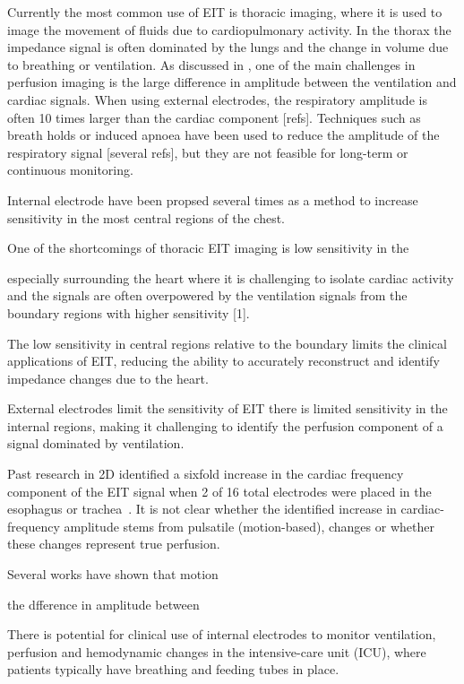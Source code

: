 Currently the most common use of EIT is
thoracic imaging, where it is used to image the movement
of fluids due to cardiopulmonary activity.
In the thorax the impedance signal is often dominated by 
the lungs and the change in volume due to breathing 
or ventilation. 
As discussed in , one of the main challenges 
in perfusion imaging is the large difference in amplitude 
between the ventilation and cardiac signals. 
When using external electrodes, the respiratory amplitude is 
often 10 times larger than the cardiac component [refs]. Techniques such as 
breath holds or induced apnoea have been used to  reduce the
amplitude of the respiratory signal [several refs], but they are not feasible for 
long-term or continuous monitoring. 


Internal electrode have been propsed several times as a method to increase 
sensitivity in the 
most central regions of the chest. 


One of the shortcomings of thoracic EIT imaging is low sensitivity in the


especially surrounding the
heart where it is challenging to isolate cardiac activity and
the signals are often overpowered by the ventilation signals
from the boundary regions with higher sensitivity [1].

The
low sensitivity in central regions relative to the boundary
limits the clinical applications of EIT, reducing the ability to
accurately reconstruct and identify impedance changes due to
the heart.

External electrodes
limit the sensitivity of EIT  
there is limited sensitivity in the internal regions, making it challenging
to identify the perfusion component of a signal dominated by ventilation.



Past research in 2D identified a sixfold increase in the cardiac frequency 
component of the EIT signal 
when 2 of 16 total electrodes were placed in the 
esophagus or trachea~\parencite{czaplik_application_2014}. It is not clear whether 
the identified increase in cardiac-frequency amplitude stems from pulsatile 
(motion-based), changes or whether these changes represent true perfusion. 


Several works have shown that motion 

the dfference in amplitude between 

There is potential for clinical use of internal electrodes 
to monitor ventilation, perfusion and 
hemodynamic changes in the 
intensive-care unit (ICU), where patients typically have
breathing and feeding tubes in place.

